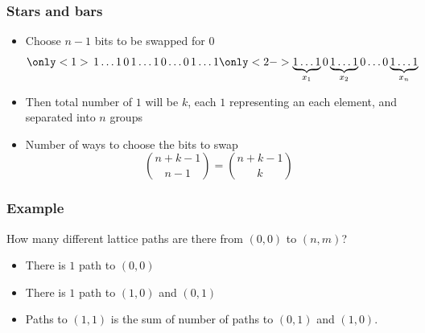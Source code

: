 \documentclass{beamer}
\begin{document}
\begin{frame}[plain]
  \frametitle{Stars and bars}
  \vspace{20pt}
  \begin{itemize}
    \item Choose $n-1$ bits to be swapped for $0$
      \[
        \only<1>{\,1\ldots1\,0\,1\ldots1\,0\ldots0\,1\ldots1}
        \only<2->{\underbrace{1\ldots1}_{x_1}0\underbrace{1\ldots1}_{x_2}0\ldots0\underbrace{1\ldots1}_{x_n}}
      \]
    \item Then total number of $1$ will be $k$, each $1$ representing an each element, and separated into $n$ groups
    \item Number of ways to choose the bits to swap
      \[
        \binom{n+k-1}{n-1} = \binom{n+k-1}{k}
      \]
  \end{itemize}
\end{frame}

\begin{frame}
  \frametitle{Example}
  \vspace{10pt}
  How many different lattice paths are there from $(0,0)$ to $(n,m)$?
  \vspace{-10pt}
      \vspace{10pt}
      \footnotesize
      \begin{itemize}
        \item There is $1$ path to $(0,0)$
        \item There is $1$ path to $(1,0)$ and $(0,1)$
        \item Paths to $(1,1)$ is the sum of number of paths to $(0,1)$ and $(1,0)$.
      \end{itemize}
\end{frame}
\end{document}
